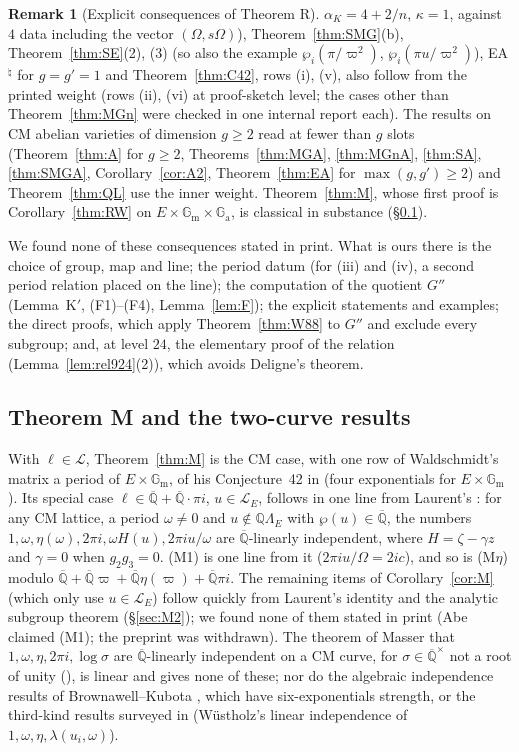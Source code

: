 \documentclass[11pt]{amsart}
\theoremstyle{definition}
\newtheorem{remark}[theorem]{Remark}
\newcommand{\Qb}{\overline{\mathbb{Q}}}
\newcommand{\Q}{\mathbb{Q}}
\newcommand{\Ga}{\mathbb{G}_{\mathrm a}}
\newcommand{\Gm}{\mathbb{G}_{\mathrm m}}
\newcommand{\Lg}{\mathcal{L}}
\newcommand{\vp}{\varpi}
\begin{document}
\begin{remark}[Explicit consequences of Theorem R]
$\alpha_K=4+2/n$, $\kappa=1$, against $4$ data including the vector $(\Omega,s\Omega)$), Theorem~\ref{thm:SMG}(b),
Theorem~\ref{thm:SE}(2), (3) (so also the example $\wp_i(\pi/\vp^2)$, $\wp_i(\pi u/\vp^2)$), EA$^\natural$ for $g=g'=1$ and
Theorem~\ref{thm:C42}, rows (i), (v), also follow from the printed weight (rows (ii), (vi) at proof-sketch level; the cases
other than Theorem~\ref{thm:MGn} were checked in one internal report each). The results on CM abelian varieties of dimension
$g\ge2$ read at fewer than $g$ slots (Theorem~\ref{thm:A} for $g\ge2$, Theorems~\ref{thm:MGA}, \ref{thm:MGnA}, \ref{thm:SA},
\ref{thm:SMGA}, Corollary~\ref{cor:A2}, Theorem~\ref{thm:EA} for $\max(g,g')\ge2$) and Theorem~\ref{thm:QL} use the inner weight.
Theorem~\ref{thm:M}, whose first proof is Corollary~\ref{thm:RW} on $E\times\Gm\times\Ga$, is classical in substance
(\S\ref{sec:novM}).

We found none of these consequences stated in print. What is ours there is the choice of group, map and line; the period
datum (for (iii) and (iv), a second period relation placed on the line); the computation of the quotient $G''$ (Lemma~K$'$,
(F1)--(F4), Lemma~\ref{lem:F}); the explicit statements and examples; the direct proofs, which apply Theorem~\ref{thm:W88}
to $G''$ and exclude every subgroup; and, at level $24$, the elementary proof of the relation (Lemma~\ref{lem:rel924}(2)),
which avoids Deligne's theorem.
\end{remark}


\subsection{Theorem M and the two-curve results}\label{sec:novM}
With $\ell\in\Lg$, Theorem~\ref{thm:M} is the CM case, with one row of Waldschmidt's matrix a period of $E\times\Gm$, of
his Conjecture~42 in \cite{W06} (four exponentials for $E\times\Gm$). Its special case $\ell\in\Qb+\Qb\cdot\pi i$,
$u\in\Lg_E$, follows in one line from Laurent's \cite[Cor.~3, p.~146]{La82}: for any CM lattice, a period $\omega\ne0$ and
$u\notin\Q\Lambda_E$ with $\wp(u)\in\Qb$, the numbers $1,\omega,\eta(\omega),2\pi i,\omega H(u),2\pi iu/\omega$ are
$\Qb$-linearly independent, where $H=\zeta-\gamma z$ and $\gamma=0$ when $g_2g_3=0$. (M1) is one line from it
($2\pi iu/\Omega=2ic$), and so is (M$\eta$) modulo $\Qb+\Qb\vp+\Qb\eta(\vp)+\Qb\pi i$. The remaining items of
Corollary~\ref{cor:M} (which only use $u\in\Lg_E$) follow quickly from Laurent's identity and the analytic subgroup theorem
(\S\ref{sec:M2}); we found none of them stated in print (Abe \cite{Abe20} claimed (M1); the preprint was withdrawn).
The theorem of Masser that $1,\omega,\eta,2\pi i,\log\sigma$ are $\Qb$-linearly independent on a CM curve, for
$\sigma\in\Qb^\times$ not a root of unity (\cite{Ma76}), is linear and
gives none of these; nor do the algebraic independence results of
Brownawell--Kubota \cite{BK77}, which have six-exponentials strength, or the third-kind results surveyed in \cite{W19}
(W\"ustholz's linear independence of $1,\omega,\eta,\lambda(u_i,\omega)$).
\end{document}
